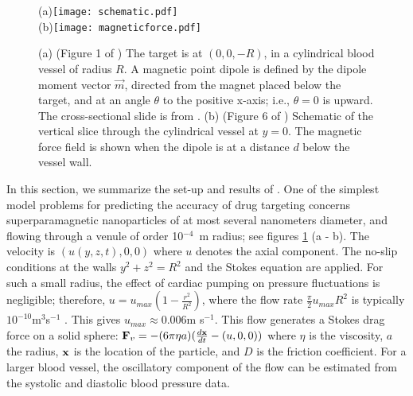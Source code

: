  

\begin{figure}[t]
(a){\texttt{[image: schematic.pdf]}}\hfil\\
(b)\texttt{[image: magneticforce.pdf]}\hfil\\
\caption{(a)  (Figure 1 of \cite{YLAR2012})  The target is  at $(0,0,-R)$, 
in a cylindrical blood vessel of radius $R$.    A  magnetic point dipole  is defined by the dipole moment 
vector $\vec m$, directed from the magnet placed  below the target, and at an angle 
$\theta$ to the positive x-axis;  i.e.,  $\theta=0$ is upward.   The cross-sectional slide  
is from \cite{arterial}. 
(b) (Figure 6 of \cite{YLAR2012}) Schematic of the vertical slice through the cylindrical vessel at $y=0$. The magnetic force field
is shown when the dipole is at a
distance $d$ below the vessel wall. }
\label{schematic}
\end{figure}


In this section, we summarize the set-up and results of \cite{YLAR2012}.
One of the simplest  model problems for predicting the 
accuracy of drug targeting concerns superparamagnetic nanoparticles of at 
most several nanometers diameter, and flowing through a  venule of order 10$^{-4}$~m radius; see 
 figures \ref{schematic} (a - b). The  velocity is  $(u(y,z,t),0,0)$ where $u$ denotes the axial component.  The no-slip conditions at the
walls $y^2+z^2=R^2$ and the Stokes equation are applied.   For such a small radius, the effect of cardiac pumping on pressure 
fluctuations is negligible; therefore, $u=u_{max}(1-\frac{r^2}{R^2})$, where the flow rate $\frac{\pi}{2}u_{max}R^2$ is typically $10^{-10}$m$^3$s$^{-1}$ \cite{House86}. 
This 
gives $u_{max}\approx 0.006$m s$^{-1}$.  This 
flow generates a Stokes drag force on a solid sphere: ${\bf F}_v=-(6\pi\eta a)(\frac{d{\bf x}}{dt}-(u,0,0))$ where $\eta$ is the viscosity, $a$ the radius, ${\bf x}$ is the location of  the particle, and  $D$ is the friction coefficient. For a larger blood vessel, the oscillatory component of the flow can be estimated from the systolic and diastolic blood pressure data. 


